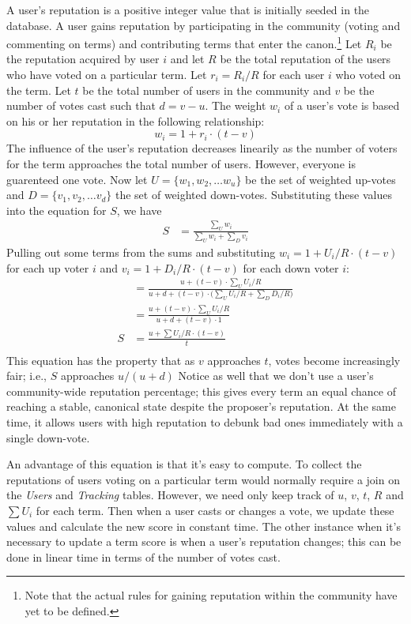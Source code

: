\documentclass[letter]{article}
\newcounter{foot}
\begin{document}
A user's reputation is a positive integer value that is initially seeded in the database. A user gains 
reputation by participating in the community (voting and commenting on terms) and contributing 
terms that enter the canon.\footnote{Note that the actual rules for gaining reputation within 
the community have yet to be defined.} Let $R_i$ be the reputation acquired by user $i$ and let $R$ be the total reputation of the users 
who have voted on a particular term. Let $r_i = R_i / R$ for each user $i$ who voted on the 
term. Let $t$ be the total number of users in the community and $v$ be the number of votes cast 
such that $d = v - u$. The weight $w_i$ of a user's vote is based on his or her 
reputation in the following relationship: 
$$ w_i = 1 + r_i \cdot (t-v) $$
The influence of the user's reputation decreases linearily as the number of voters for the term
approaches the total number of users. However, everyone is guarenteed one vote.  
Now let $U = \{w_1, w_2, \dots w_u\}$ be the set of weighted up-votes and $D = \{v_1, v_2, \dots v_d\}$
the set of weighted down-votes. Substituting these values into the equation for $S$, we have
\begin{align*} 
S &= \frac{\sum_U{w_i}}{\sum_U{w_i} + \sum_D{v_i}}
\end{align*}
Pulling out some terms from the sums and substituting $w_i = 1 + U_i / R \cdot (t-v)$ for each up voter $i$ 
and $v_i = 1 + D_i / R \cdot (t-v)$ for each down voter $i$:
\begin{align*}
  &= \frac{u + (t - v) \cdot \sum_U{U_i/R}}{u + d + (t-v) \cdot \big( \sum_U{U_i/R} + \sum_D{D_i/R} \big)} \\
  &= \frac{u + (t - v) \cdot \sum_U{U_i/R}}{u + d + (t-v) \cdot 1} \\
S &= \frac{u + \sum{U_i/R} \cdot (t - v)}{t} \\
\end{align*}
This equation has the property that as $v$ approaches $t$, votes become increasingly fair; i.e., 
$S$ approaches $ u / (u + d)$
Notice as well that we don't use a user's community-wide reputation percentage; this gives every term an 
equal chance of reaching a stable, canonical state despite the proposer's reputation. At the same time, 
it allows users with high reputation to debunk bad ones immediately with a single down-vote. 

An advantage of this equation is that it's easy to compute. To collect the reputations of users voting
on a particular term would normally require a join on the \textit{Users} and \textit{Tracking} tables. 
However, we need only keep track of $u$, $v$, $t$, $R$ and $\sum{U_i}$ for each term. Then when a user
casts or changes a vote, we update these values and calculate the new score in constant time. The other
instance when it's necessary to update a term score is when a user's reputation changes; this can be 
done in linear time in terms of the number of votes cast. 
\end{document}
